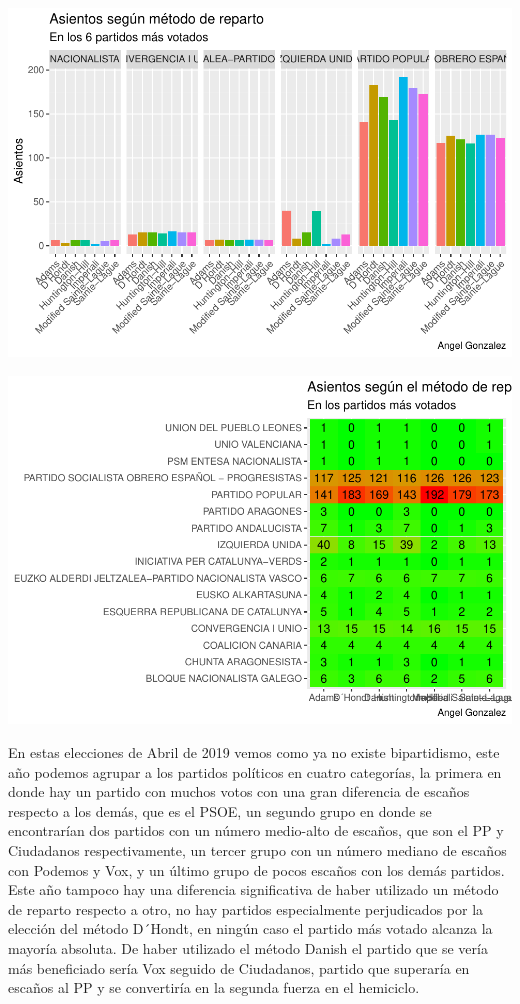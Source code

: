 \documentclass[12pt,a4paper,]{book}
\numberwithin{dummy}{section}
\theoremstyle{ocrenumbox}
\theoremstyle{blacknumex}
\theoremstyle{blacknumbox}
\theoremstyle{ocrenum}
\theoremstyle{ocrenum}
\begin{document}
\begin{center}\includegraphics[width=0.95\linewidth]{figurasR/unnamed-chunk-128-1} \end{center}

\begin{center}\includegraphics[width=0.95\linewidth]{figurasR/unnamed-chunk-128-2} \end{center}

En estas elecciones de Abril de 2019 vemos como ya no existe
bipartidismo, este año podemos agrupar a los partidos políticos en
cuatro categorías, la primera en donde hay un partido con muchos votos
con una gran diferencia de escaños respecto a los demás, que es el PSOE,
un segundo grupo en donde se encontrarían dos partidos con un número
medio-alto de escaños, que son el PP y Ciudadanos respectivamente, un
tercer grupo con un número mediano de escaños con Podemos y Vox, y un
último grupo de pocos escaños con los demás partidos. Este año tampoco
hay una diferencia significativa de haber utilizado un método de reparto
respecto a otro, no hay partidos especialmente perjudicados por la
elección del método D´Hondt, en ningún caso el partido más votado
alcanza la mayoría absoluta. De haber utilizado el método Danish el
partido que se vería más beneficiado sería Vox seguido de Ciudadanos,
partido que superaría en escaños al PP y se convertiría en la segunda
fuerza en el hemiciclo.
\end{document}
